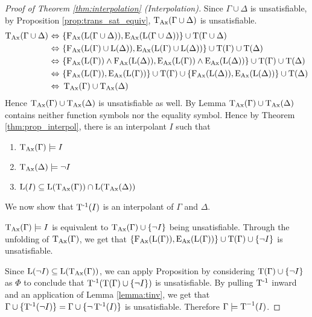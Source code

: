 		\begin{proof}[Proof of Theorem \ref{thm:interpolation} (Interpolation)]

			Since $\Gamma \cup \Delta$ is unsatisfiable,
			by Proposition \ref{prop:trans_sat_equiv}, $\TransAll(\Gamma \cup \Delta)$ is unsatisfiable.
			\begin{align*}
				\TransAll(\Gamma \cup \Delta)\,\liff~&\{\FAX(\Lang(\Gamma\cup\Delta)), \EAX(\Lang(\Gamma \cup\Delta))\} \cup \Trans(\Gamma \cup \Delta) \\
				\liff~&\{\FAX(\Lang(\Gamma)\cup\Lang(\Delta)), \EAX(\Lang(\Gamma)\cup\Lang(\Delta))\} \cup \Trans(\Gamma )\cup \Trans(\Delta) \\
				\liff~&\{\FAX(\Lang(\Gamma)) \land \FAX(\Lang(\Delta)), \EAX(\Lang(\Gamma)) \land \EAX(\Lang(\Delta))\} \cup \Trans(\Gamma) \cup \Trans(\Delta) \\
				\liff~&\{\FAX(\Lang(\Gamma)),\EAX(\Lang(\Gamma))\} \cup \Trans(\Gamma) \cup \{\FAX(\Lang(\Delta)), \EAX(\Lang(\Delta))\} \cup \Trans(\Delta) \\
				\liff~&\TransAll(\Gamma) \cup \TransAll(\Delta)
			\end{align*}
			Hence  $\TransAll(\Gamma) \cup \TransAll(\Delta)$ is unsatisfiable as well.
			By Lemma  $\TransAll(\Gamma) \cup \TransAll(\Delta)$ contains neither function symbols nor the equality symbol.
			Hence by Theorem \ref{thm:prop_interpol}, there is an interpolant $I$ such that
			\begin{enumerate}
				\item $\TransAll(\Gamma) \entails I$
				\item $\TransAll(\Delta) \entails \lnot I$ 
				\item $\Lang(I) \subseteq \Lang(\TransAll(\Gamma)) \cap \Lang(\TransAll(\Delta))$
					\label{proof:interpolation1_3}
			\end{enumerate}

			We now show that $\TransInv(I)$ is an interpolant of $\Gamma$ and $\Delta$.

			$\TransAll(\Gamma) \entails I$ is equivalent to $\TransAll(\Gamma) \cup \{\lnot I\}$ being unsatisfiable.
			Through the unfolding of $\TransAll(\Gamma)$, we get that 
			$\{\FAX(\Lang(\Gamma)), \EAX(\Lang(\Gamma))\} \cup \Trans(\Gamma) \cup \{\lnot I\}$ is unsatisfiable.

			Since $\Lang(\lnot I) \subseteq \Lang(\TransAll(\Gamma))$, we can apply Proposition
			by considering $\Trans(\Gamma) \cup \{\lnot I\}$ as $\Phi$ to conclude that $\TransInv(\Trans(\Gamma) \cup \{\lnot I\})$ is unsatisfiable. By pulling $\TransInv$ inward and an application of Lemma \ref{lemma:tinv}, we get that $\Gamma \cup \{\TransInv(\lnot I)\} = \Gamma \cup \{\lnot \TransInv(I)\}$ is unsatisfiable. 
			Therefore $\Gamma \entails \Trans^{-1}(I)$.


\end{proof}
